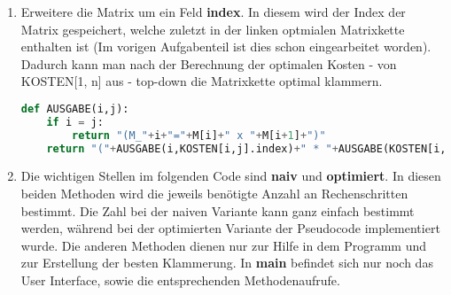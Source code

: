 \documentclass[a4paper,10pt]{article}
\begin{document}
\begin{enumerate}
\begin{description}
	\end{description}
\item Erweitere die Matrix um ein Feld \textbf{index}. In diesem wird der Index der Matrix gespeichert, welche zuletzt in der linken optmialen Matrixkette enthalten ist (Im vorigen Aufgabenteil ist dies schon eingearbeitet worden). Dadurch kann man nach der Berechnung der optimalen Kosten - von KOSTEN[1, n] aus - top-down die Matrixkette optimal klammern.
\begin{lstlisting}[mathescape=true,language=Python,caption={AUSGABE}]
def AUSGABE(i,j):
    if i = j:
        return "(M_"+i+"="+M[i]+" x "+M[i+1]+")"
    return "("+AUSGABE(i,KOSTEN[i,j].index)+" * "+AUSGABE(KOSTEN[i,j].index+1,j)+")"
\end{lstlisting}
\item Die wichtigen Stellen im folgenden Code sind \textbf{naiv} und \textbf{optimiert}. In diesen beiden Methoden wird die jeweils benötigte Anzahl an Rechenschritten bestimmt. Die Zahl bei der naiven Variante kann ganz einfach bestimmt werden, während bei der optimierten Variante der Pseudocode implementiert wurde. Die anderen Methoden dienen nur zur Hilfe in dem Programm und zur Erstellung der besten Klammerung. In \textbf{main} befindet sich nur noch das User Interface, sowie die entsprechenden Methodenaufrufe.
      
\end{enumerate}
\end{document}
